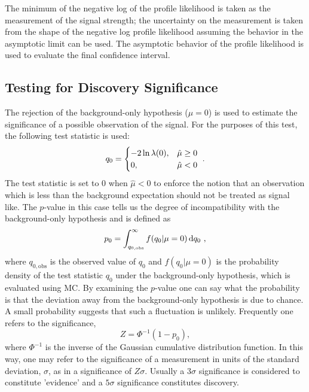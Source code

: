 The minimum of the negative log of the profile likelihood 
is taken as the measurement of the signal strength; 
the uncertainty on the measurement is taken from the shape of the 
negative log profile likelihood assuming the behavior in the asymptotic
limit can be used.  The asymptotic behavior of the profile likelihood 
is used to evaluate the final confidence interval. 


\subsection{Testing for Discovery Significance}
The rejection of the background-only hypothesis ($\mu = 0$) is used 
to estimate the significance of a possible observation of the signal.
For the purposes of this test, the following test 
statistic is used:
\begin{equation}
q_{0} = 
\begin{cases}
\hfill -2 \ln \lambda(0),\hfill & \hat{\mu} \geq 0 \\
0,\hfill & \hat{\mu} < 0
\end{cases}~.
\label{eq:q0}
\end{equation}
The test statistic is set to $0$ when $\hat{\mu} < 0$ to enforce
the notion that an observation which is less than the background
expectation should not be treated as signal like. The $p$-value in this case
tells us the degree of incompatibility with the background-only hypothesis
and is defined as
\begin{equation}
p_0=\int^{\infty }_{q_{0,\textrm{obs}}} f(q_0|\mu=0) \mathop{}\!\mathrm{d}q_0~,
\label{eq:pvalue}
\end{equation}
where $q_{0,\textrm{obs}}$ is the observed value of $q_0$ and 
$f(q_0|\mu=0)$ is the probability density of the test statistic $q_0$ under
the background-only hypothesis, which is evaluated using MC. %
By examining the $p$-value one can say what the probability is 
that the deviation away from the background-only hypothesis is due
to chance. A small probability suggests that such a fluctuation is
unlikely. Frequently one refers to the significance,
\begin{equation}
Z = \Phi^{-1}(1-p_0),
\label{eq:significance}
\end{equation}
where $\Phi^{-1}$ is the inverse of the Gaussian cumulative distribution 
function.
In this way, one may refer to the significance of a measurement
in units of the standard deviation, $\sigma$, as in a significance
of $Z\sigma$.
Usually
a $3\sigma$ significance 
is considered to constitute 'evidence' and a $5\sigma$ significance constitutes
discovery.

